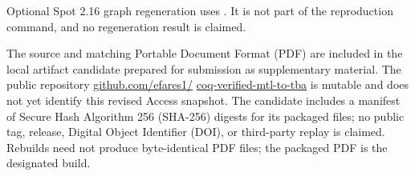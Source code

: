 \documentclass{ieeeaccess}
\begin{document}
Optional Spot 2.16 graph regeneration uses
. It is not part of the reproduction
command, and no regeneration result is claimed.

The source and matching Portable Document Format (PDF) are included in the
local artifact candidate prepared for submission as supplementary material.
The public repository \url{github.com/efares1/}\allowbreak%
\url{coq-verified-mtl-to-tba} is mutable and does not yet identify this
revised Access snapshot. The candidate
 includes a manifest of Secure Hash
Algorithm 256 (SHA-256) digests for its packaged files; no public tag, release,
Digital Object Identifier (DOI), or third-party replay is claimed. Rebuilds
need not produce byte-identical PDF files; the packaged PDF is the designated
build.
\end{document}
